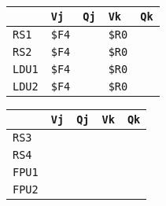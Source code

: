 \begin{enumerate}
    \begin{minipage}{0.45\textwidth}
        \centering
        \begin{tabular}{@{} l | l l l l @{}}
            \toprule
                & \texttt{Vj} & \texttt{Qj} & \texttt{Vk} & \texttt{Qk} \\
            \midrule
            \texttt{RS1} & \texttt{\$F4} & & \texttt{\$R0} & \\ [.3em]
            \texttt{RS2} & \texttt{\$F4} & & \texttt{\$R0} & \\
            \cmidrule{1-5}
            \texttt{LDU1} & \texttt{\$F4} & & \texttt{\$R0} & \\ [.3em]
            \texttt{LDU2} & \texttt{\$F4} & & \texttt{\$R0} & \\
            \bottomrule
        \end{tabular}
    \end{minipage}
    \hfill
    \begin{minipage}{0.45\textwidth}
        \centering
        \begin{tabular}{@{} l | l l l l @{}}
            \toprule
            & \texttt{Vj} & \texttt{Qj} & \texttt{Vk} & \texttt{Qk} \\
            \midrule
            \texttt{RS3} & & & & \\ [.3em]
            \texttt{RS4} & & & & \\
            \cmidrule{1-5}
            \texttt{FPU1} & & & & \\ [.3em]
            \texttt{FPU2} & & & & \\
            \bottomrule
        \end{tabular}
    \end{minipage}


\end{enumerate}
